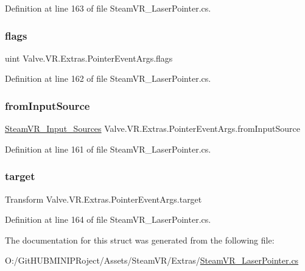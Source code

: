 Definition at line 163 of file Steam\+V\+R\+\_\+\+Laser\+Pointer.\+cs.

\mbox{\label{struct_valve_1_1_v_r_1_1_extras_1_1_pointer_event_args_a3ef5a343968b21c5e88611bc3381172f}} 
\subsubsection{\texorpdfstring{flags}{flags}}
{\footnotesize\ttfamily uint Valve.\+V\+R.\+Extras.\+Pointer\+Event\+Args.\+flags}



Definition at line 162 of file Steam\+V\+R\+\_\+\+Laser\+Pointer.\+cs.

\mbox{\label{struct_valve_1_1_v_r_1_1_extras_1_1_pointer_event_args_a80f9c03f66b8ce98780088b7e824dc0c}} 
\subsubsection{\texorpdfstring{fromInputSource}{fromInputSource}}
{\footnotesize\ttfamily \mbox{\hyperlink{namespace_valve_1_1_v_r_a82e5bf501cc3aa155444ee3f0662853f}{Steam\+V\+R\+\_\+\+Input\+\_\+\+Sources}} Valve.\+V\+R.\+Extras.\+Pointer\+Event\+Args.\+from\+Input\+Source}



Definition at line 161 of file Steam\+V\+R\+\_\+\+Laser\+Pointer.\+cs.

\mbox{\label{struct_valve_1_1_v_r_1_1_extras_1_1_pointer_event_args_a1fbaa36b05f278adb3e4193f53b0a847}} 
\subsubsection{\texorpdfstring{target}{target}}
{\footnotesize\ttfamily Transform Valve.\+V\+R.\+Extras.\+Pointer\+Event\+Args.\+target}



Definition at line 164 of file Steam\+V\+R\+\_\+\+Laser\+Pointer.\+cs.



The documentation for this struct was generated from the following file\+:\begin{DoxyCompactItemize}
\item 
O\+:/\+Git\+H\+U\+B\+M\+I\+N\+I\+P\+Roject/\+Assets/\+Steam\+V\+R/\+Extras/\mbox{\hyperlink{_steam_v_r___laser_pointer_8cs}{Steam\+V\+R\+\_\+\+Laser\+Pointer.\+cs}}\end{DoxyCompactItemize}
